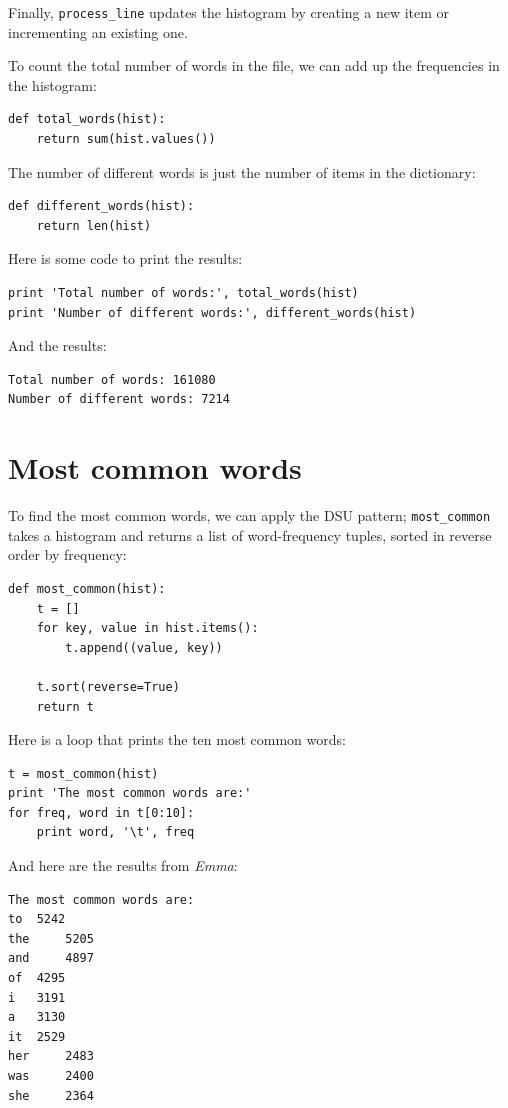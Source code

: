 \documentclass[10pt]{book}
\begin{document}
\begin{CJK}{UTF8}{gbsn}
Finally, \verb"process_line" updates the histogram by creating a new
item or incrementing an existing one.

To count the total number of words in the file, we can add up
the frequencies in the histogram:

\begin{verbatim}
def total_words(hist):
    return sum(hist.values())
\end{verbatim}
%
The number of different words is just the number of items in
the dictionary:

\begin{verbatim}
def different_words(hist):
    return len(hist)
\end{verbatim}
%
Here is some code to print the results:

\begin{verbatim}
print 'Total number of words:', total_words(hist)
print 'Number of different words:', different_words(hist)
\end{verbatim}
%
And the results:

\begin{verbatim}
Total number of words: 161080
Number of different words: 7214
\end{verbatim}
%

\section{Most common words}

To find the most common words, we can apply the DSU pattern;
\verb"most_common" takes a histogram and returns a list of
word-frequency tuples, sorted in reverse order by frequency:

\begin{verbatim}
def most_common(hist):
    t = []
    for key, value in hist.items():
        t.append((value, key))

    t.sort(reverse=True)
    return t
\end{verbatim}
%
Here is a loop that prints the ten most common words:

\begin{verbatim}
t = most_common(hist)
print 'The most common words are:'
for freq, word in t[0:10]:
    print word, '\t', freq
\end{verbatim}
%
And here are the results from {\em Emma}:

\begin{verbatim}
The most common words are:
to 	5242
the 	5205
and 	4897
of 	4295
i 	3191
a 	3130
it 	2529
her 	2483
was 	2400
she 	2364
\end{verbatim}
%


\end{CJK}
\end{document}

